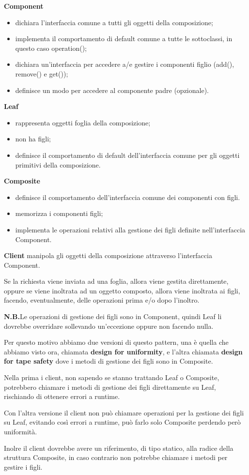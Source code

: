 \textbf{Component}
\begin{itemize}
    \item dichiara l’interfaccia comune a tutti gli oggetti della composizione;
    \item implementa il comportamento di default comune a tutte le sottoclassi, in questo caso operation();
    \item dichiara un’interfaccia per accedere a/e gestire i componenti figlio (add(), remove() e get());
    \item definisce un modo per accedere al componente padre (opzionale).
\end{itemize}

\textbf{Leaf}
\begin{itemize}
    \item rappresenta oggetti foglia della composizione;
    \item non ha figli;
    \item definisce il comportamento di default dell’interfaccia comune per gli oggetti primitivi della composizione.
\end{itemize} 

\textbf{Composite}
\begin{itemize}
    \item definisce il comportamento dell’interfaccia comune dei componenti con figli.
    \item memorizza i componenti figli;
    \item implementa le operazioni relativi alla gestione dei figli definite nell’interfaccia Component.
\end{itemize}

\textbf{Client} manipola gli oggetti della composizione attraverso l’interfaccia Component.
\medskip

Se la richiesta viene inviata ad una foglia, allora viene gestita direttamente, oppure se viene inoltrata ad un oggetto composto, allora viene inoltrata ai figli, 
facendo, eventualmente, delle operazioni prima e/o dopo l’inoltro.

\medskip
\textbf{N.B.}Le operazioni di gestione dei figli sono in Component, quindi Leaf li dovrebbe overridare sollevando un'eccezione oppure non facendo nulla.
\medskip

Per questo motivo abbiamo due versioni di questo pattern, una è quella che abbiamo visto ora, chiamata \textbf{design for uniformity}, e l'altra chiamata 
\textbf{design for tape safety} dove i metodi di gestione dei figli sono in Composite.

Nella prima i client, non sapendo se stanno trattando Leaf o Composite, potrebbero chiamare i metodi di gestione dei figli direttamente su Leaf, rischiando di 
ottenere errori a runtime.

Con l'altra versione il client non può chiamare operazioni per la gestione dei figli su Leaf, evitando così errori a runtime, può farlo solo Composite perdendo però 
uniformità.

Inolre il client dovrebbe avere un riferimento, di tipo statico, alla radice della struttura Composite, in caso contrario non potrebbe chiamare i metodi per 
gestire i figli.
